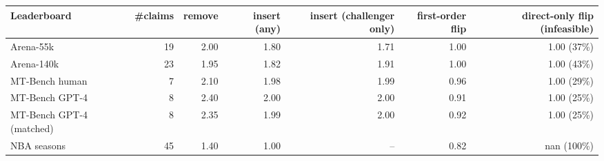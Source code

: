 \begin{tabular}{lrrrrrr}
\toprule
 Leaderboard & \#claims & remove & insert (any) & insert (challenger only) & first-order flip & direct-only flip (infeasible) \\
\midrule
Arena-55k & 19 & 2.00 & 1.80 & 1.71 & 1.00 & 1.00 (37\%) \\
Arena-140k & 23 & 1.95 & 1.82 & 1.91 & 1.00 & 1.00 (43\%) \\
MT-Bench human & 7 & 2.10 & 1.98 & 1.99 & 0.96 & 1.00 (29\%) \\
MT-Bench GPT-4 & 8 & 2.40 & 2.00 & 2.00 & 0.91 & 1.00 (25\%) \\
MT-Bench GPT-4 (matched) & 8 & 2.35 & 1.99 & 2.00 & 0.92 & 1.00 (25\%) \\
NBA seasons & 45 & 1.40 & 1.00 & -- & 0.82 & nan (100\%) \\
\bottomrule
\end{tabular}

